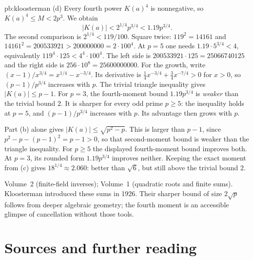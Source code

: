 \begin{solution}{pb:kloosterman}
(d) Every fourth power $K(a)^4$ is nonnegative, so $K(a)^4\le M<2p^3$. We obtain
\[
|K(a)|<2^{1/4}p^{3/4}<1.19p^{3/4}.
\]
The second comparison is $2^{1/4}<119/100$. Square twice: $119^2=14161$ and $14161^2=200533921>200000000=2\cdot100^4$. At $p=5$ one needs $1.19\cdot5^{3/4}<4$, equivalently $119^4\cdot125<4^4\cdot100^4$. The left side is $200533921\cdot125=25066740125$ and the right side is $256\cdot10^8=25600000000$. For the growth, write $(x-1)/x^{3/4}=x^{1/4}-x^{-3/4}$. Its derivative is $\frac14 x^{-3/4}+\frac34 x^{-7/4}>0$ for $x>0$, so $(p-1)/p^{3/4}$ increases with $p$.
The trivial triangle inequality gives $|K(a)|\le p-1$. For $p=3$, the fourth-moment bound $1.19p^{3/4}$ is \emph{weaker} than the trivial bound $2$. It is sharper for every odd prime $p\ge5$: the inequality holds at $p=5$, and $(p-1)/p^{3/4}$ increases with $p$. Its advantage then grows with $p$.

Part (b) alone gives $|K(a)|\le\sqrt{p^2-p}$. This is larger than $p-1$, since $p^2-p-(p-1)^2=p-1>0$, so that second-moment bound is weaker than the triangle inequality. For $p\ge5$ the displayed fourth-moment bound improves both. At $p=3$, its rounded form $1.19p^{3/4}$ improves neither. Keeping the exact moment from (c) gives $18^{1/4}\approx2.060$: better than $\sqrt6$, but still above the trivial bound $2$.

\tools Volume~2 (finite-field inverses); Volume~1 (quadratic roots and finite sums).
\leads Kloosterman introduced these sums in 1926. Their sharper bound of size $2\sqrt p$ follows from deeper algebraic geometry; the fourth moment is an accessible glimpse of cancellation without those tools.
\end{solution}

\section*{Sources and further reading}

